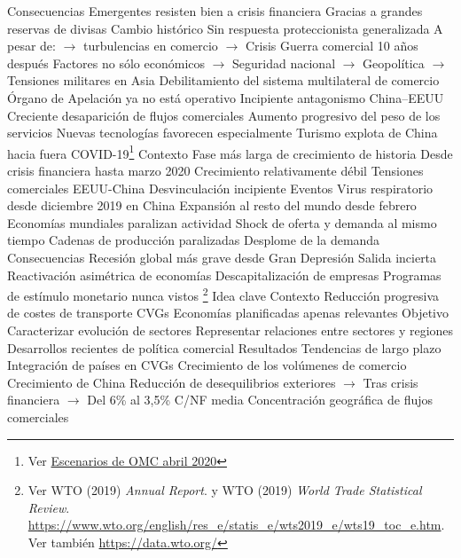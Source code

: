\documentclass{nuevotema}
\begin{document}
\begin{esquemal}
			\3 Consecuencias
				\4 Emergentes resisten bien a crisis financiera
				\4[] Gracias a grandes reservas de divisas
				\4[] Cambio histórico
				\4 Sin respuesta proteccionista generalizada
				\4[] A pesar de:
				\4[] $\to$ turbulencias en comercio
				\4[] $\to$ Crisis
				\4 Guerra comercial 10 años después
				\4[] Factores no sólo económicos
				\4[] $\to$ Seguridad nacional
				\4[] $\to$ Geopolítica
				\4[] $\to$ Tensiones militares en Asia
				\4 Debilitamiento del sistema multilateral de comercio
				\4[] Órgano de Apelación ya no está operativo
				\4 Incipiente antagonismo China--EEUU
				\4[] Creciente desaparición de flujos comerciales
				\4 Aumento progresivo del peso de los servicios
				\4[] Nuevas tecnologías favorecen especialmente
				\4[] Turismo explota de China hacia fuera
		\2 COVID-19\footnote{Ver \href{https://www.wto.org/english/news_e/pres20_e/pr855_e.htm}{Escenarios de OMC abril 2020}}
			\3 Contexto
				\4 Fase más larga de crecimiento de historia
				\4[] Desde crisis financiera hasta marzo 2020
				\4 Crecimiento relativamente débil
				\4 Tensiones comerciales EEUU-China
				\4 Desvinculación incipiente
			\3 Eventos
				\4 Virus respiratorio desde diciembre 2019 en China
				\4 Expansión al resto del mundo desde febrero
				\4 Economías mundiales paralizan actividad
				\4 Shock de oferta y demanda al mismo tiempo
				\4[] Cadenas de producción paralizadas
				\4[] Desplome de la demanda
			\3 Consecuencias
				\4 Recesión global más grave desde Gran Depresión
				\4 Salida incierta
				\4 Reactivación asimétrica de economías
				\4 Descapitalización de empresas
				\4 Programas de estímulo monetario nunca vistos
	\1 \footnote{Ver WTO (2019) \textit{Annual Report}. y WTO (2019) \textit{World Trade Statistical Review}. \url{https://www.wto.org/english/res_e/statis_e/wts2019_e/wts19_toc_e.htm}. Ver también \url{https://data.wto.org/}}
		\2 Idea clave
			\3 Contexto
				\4 Reducción progresiva de costes de transporte
				\4 CVGs
				\4 Economías planificadas apenas relevantes
			\3 Objetivo
				\4 Caracterizar evolución de sectores
				\4 Representar relaciones entre sectores y regiones
				\4 Desarrollos recientes de política comercial
			\3 Resultados
				\4 Tendencias de largo plazo
				\4[] Integración de países en CVGs
				\4[] Crecimiento de los volúmenes de comercio
				\4[] Crecimiento de China
				\4[] Reducción de desequilibrios exteriores
				\4[] $\to$ Tras crisis financiera
				\4[] $\to$ Del 6\% al 3,5\% C/NF media
				\4[] Concentración geográfica de flujos comerciales

\end{esquemal}
\end{document}
